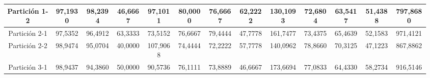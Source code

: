 \documentclass[12pt]{article}
\begin{document}
\begin{table}[H]
{\begin{tabular}{|c|cccc|cccc|cccc|}
Partición 1-2 & \multicolumn{1}{c|}{97,1930}                                                  & \multicolumn{1}{c|}{98,2394}                                                 & \multicolumn{1}{c|}{46,6667} & 97,1011  & \multicolumn{1}{c|}{80,0000}                                                  & \multicolumn{1}{c|}{76,6667}                                                 & \multicolumn{1}{c|}{62,2222} & 130,1093 & \multicolumn{1}{c|}{72,6804}                                                  & \multicolumn{1}{c|}{63,5417}                                                 & \multicolumn{1}{c|}{51,4388} & 797,8680  \\ \hline
Partición 2-1 & \multicolumn{1}{c|}{97,5352}                                                  & \multicolumn{1}{c|}{96,4912}                                                 & \multicolumn{1}{c|}{63,3333} & 73,5152  & \multicolumn{1}{c|}{76,6667}                                                  & \multicolumn{1}{c|}{79,4444}                                                 & \multicolumn{1}{c|}{47,7778} & 161,7477 & \multicolumn{1}{c|}{73,4375}                                                  & \multicolumn{1}{c|}{65,4639}                                                 & \multicolumn{1}{c|}{52,1583} & 971,4121  \\ \hline
Partición 2-2 & \multicolumn{1}{c|}{98,9474}                                                  & \multicolumn{1}{c|}{95,0704}                                                 & \multicolumn{1}{c|}{40,0000} & 107,9068 & \multicolumn{1}{c|}{74,4444}                                                  & \multicolumn{1}{c|}{72,2222}                                                 & \multicolumn{1}{c|}{57,7778} & 140,0962 & \multicolumn{1}{c|}{78,8660}                                                  & \multicolumn{1}{c|}{70,3125}                                                 & \multicolumn{1}{c|}{47,1223} & 867,8862  \\ \hline
Partición 3-1 & \multicolumn{1}{c|}{98,9437}                                                  & \multicolumn{1}{c|}{94,3860}                                                 & \multicolumn{1}{c|}{50,0000} & 90,5736  & \multicolumn{1}{c|}{76,1111}                                                  & \multicolumn{1}{c|}{73,8889}                                                 & \multicolumn{1}{c|}{46,6667} & 173,6694 & \multicolumn{1}{c|}{77,0833}                                                  & \multicolumn{1}{c|}{64,4330}                                                 & \multicolumn{1}{c|}{58,2734} & 916,5146  \\ \hline

\end{tabular}}
\end{table}
\end{document}
